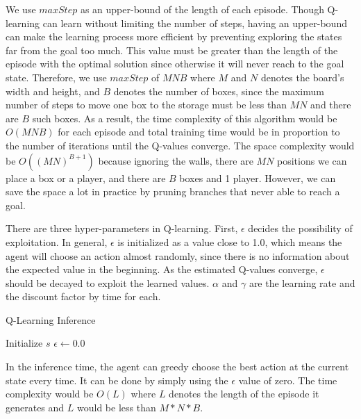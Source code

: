 \documentclass{article}
\begin{document}
We use $maxStep$ as an upper-bound of the length of each episode. Though Q-learning can learn without limiting the number of steps, having an upper-bound can make the learning process more efficient by preventing exploring the states far from the goal too much. This value must be greater than the length of the episode with the optimal solution since otherwise it will never reach to the goal state. Therefore, we use $maxStep$ of $MNB$ where $M$ and $N$ denotes the board's width and height, and $B$ denotes the number of boxes, since the maximum number of steps to move one box to the storage must be less than $MN$ and there are $B$ such boxes. As a result, the time complexity of this algorithm would be $O(MNB)$ for each episode and total training time would be in proportion to the number of iterations until the Q-values converge. The space complexity would be $O((MN)^{B+1})$ because ignoring the walls, there are $MN$ positions we can place a box or a player, and there are $B$ boxes and 1 player. However, we can save the space a lot in practice by pruning branches that never able to reach a goal.

There are three hyper-parameters in Q-learning. First, $\epsilon$ decides the possibility of exploitation. In general, $\epsilon$ is initialized as a value close to 1.0, which means the agent will choose an action almost randomly, since there is no information about the expected value in the beginning. As the estimated Q-values converge, $\epsilon$ should be decayed to exploit the learned values. $\alpha$ and $\gamma$ are the learning rate and the discount factor by time for each.  

\begin{algorithm}[H]
\caption{Q-Learning Inference}\label{alg:two}
Initialize $s$ 
$\epsilon \gets 0.0$ 

\end{algorithm}

In the inference time, the agent can greedy choose the best action at the current state every time. It can be done by simply using the $\epsilon$ value of zero. The time complexity would be $O(L)$ where $L$ denotes the length of the episode it generates and $L$ would be less than $M*N*B$.
\end{document}
